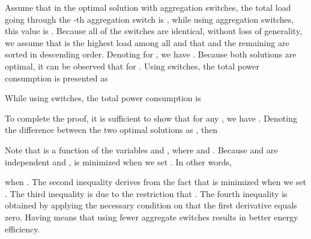 \documentclass[journal,single-space,two column,twoside,10pt]{IEEEtran}
\begin{document}
Assume that in the optimal solution with  aggregation switches, the total load going through the -th aggregation switch is  , while using  aggregation switches, this value is  . Because all of the switches are identical, without loss of generality, we assume that  is the highest load among all  and that  and the remaining  are sorted in descending order. Denoting  for , we have . Because both solutions are optimal, it can be observed that  for . Using  switches, the total power consumption is presented as

While using  switches, the total power consumption is

To complete the proof, it is sufficient to show that for any , we have . Denoting the difference between the two optimal solutions as , then

Note that  is a function of the variables  and , where  and . Because  and  are independent and ,  is minimized when we set . In other words,

when . The second inequality derives from the fact that  is minimized when we set . The third inequality is due to the restriction that . The fourth inequality is obtained by applying the necessary condition on  that the first derivative equals zero. Having  means that using fewer aggregate switches results in better energy efficiency. 

\nobalance
\end{document}
